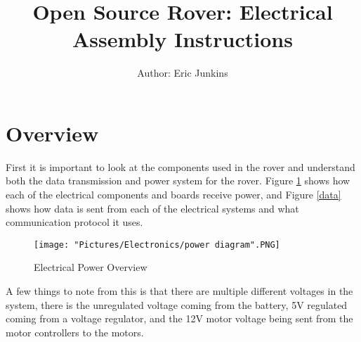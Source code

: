 \documentclass[12pt]{article}
\begin{document}
\title{Open Source Rover: Electrical Assembly Instructions}
\author{Author: Eric Junkins}

\makeatletter         
\def\@maketitle{
\begin{center}	
	\makebox[\textwidth][c]{ \texttt{[image: "Pictures/Electronics/electronics title".png]}}
	{\Huge \bfseries \sffamily \@title }\\[3ex] 
	{\Large \sffamily \@author}\\[3ex] 
	\texttt{[image: "Pictures/Electronics/JPL logo".png]}
\end{center}}
\makeatother

\maketitle




\newpage


\tableofcontents

\newpage

\section{Overview}

First it is important to look at the components used in the rover and understand both the data transmission and power system for the rover. Figure \ref{power} shows how each of the electrical components and boards receive power, and Figure \ref{data} shows how data is sent from each of the electrical systems and what communication protocol it uses. 
\begin{figure}[H]
  	\centering
    	\texttt{[image: "Pictures/Electronics/power diagram".PNG]}
  	\caption{Electrical Power Overview}
	\label{power}
\end{figure}

\noindent A few things to note from this is that there are multiple different voltages in the system, there is the unregulated voltage coming from the battery, 5V regulated coming from a voltage regulator, and the 12V motor voltage being sent from the motor controllers to the motors. 
\end{document}
